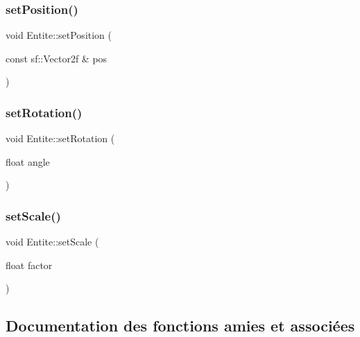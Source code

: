\mbox{\label{class_entite_a2d97c53ed1b1f6d9c078aa1a89c474fe}} 
\subsubsection{\texorpdfstring{set\+Position()}{setPosition()}}
{\footnotesize\ttfamily void Entite\+::set\+Position (\begin{DoxyParamCaption}\item[{const sf\+::\+Vector2f \&}]{pos }\end{DoxyParamCaption})}

\mbox{\label{class_entite_acefaaf63dfe743c73fba1e6143015827}} 
\subsubsection{\texorpdfstring{set\+Rotation()}{setRotation()}}
{\footnotesize\ttfamily void Entite\+::set\+Rotation (\begin{DoxyParamCaption}\item[{float}]{angle }\end{DoxyParamCaption})}

\mbox{\label{class_entite_a3cfd095f6712461cb8c9baa2f6955088}} 
\subsubsection{\texorpdfstring{set\+Scale()}{setScale()}}
{\footnotesize\ttfamily void Entite\+::set\+Scale (\begin{DoxyParamCaption}\item[{float}]{factor }\end{DoxyParamCaption})}



\subsection{Documentation des fonctions amies et associées}
\mbox{\label{class_entite_ac85cf277aaeb8a314734c1fa5f35e3be}} 
